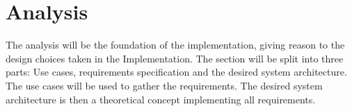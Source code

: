 \clearpage
\section{Analysis} \label{sec:analysis}
The analysis will be the foundation of the implementation, giving reason to the design choices taken in the Implementation. The section will be split into three parts: Use cases, requirements specification and the desired system architecture. The use cases will be used to gather the requirements. The desired system architecture is then a theoretical concept implementing all requirements.








